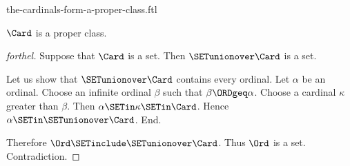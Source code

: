 \documentclass{naproche-library}
\begin{document}
\begin{smodule}[title=The Cardinals Form a Proper Class -- Cantor's First Paradox]{the-cardinals-form-a-proper-class.ftl}

\begin{theorem}[forthel,title=Cantor's First Paradox,id=cantor_paradox_1]
  $\Card$ is a proper class.
\end{theorem}
\begin{proof}[forthel]
  Suppose that $\Card$ is a set.
  Then $\SETunionover \Card$ is a set.

  Let us show that $\SETunionover \Card$ contains every ordinal.
    Let $\alpha$ be an ordinal.
    Choose an infinite ordinal $\beta$ such that $\beta \ORDgeq \alpha$.
    Choose a cardinal $\kappa$ greater than $\beta$.
    Then $\alpha \SETin \kappa \SETin \Card$.
    Hence $\alpha \SETin \SETunionover \Card$.
  End.

  Therefore $\Ord \SETinclude \SETunionover \Card$.
  Thus $\Ord$ is a set.
  Contradiction.
\end{proof}
\end{smodule}
\end{document}
